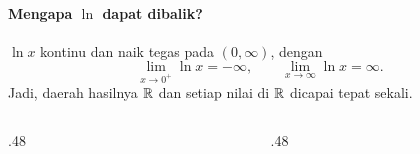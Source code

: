 \documentclass{../../kalkulus-ppt}
\begin{document}
\begin{frame}{\insertsection}
    \framesubtitle{Mengapa $\ln$ dapat dibalik?}
    \begin{teorema}
        $\ln x$ kontinu dan naik tegas pada $(0,\infty)$, dengan
        \[
            \lim_{x\to 0^+}\ln x=-\infty,\qquad
            \lim_{x\to\infty}\ln x=\infty.
        \]
        Jadi, daerah hasilnya $\mathbb{R}$ dan setiap nilai di $\mathbb{R}$ dicapai tepat sekali.
    \end{teorema}
    \begin{columns}[t,onlytextwidth]
        \begin{column}{.48\textwidth}
        \end{column}
        \begin{column}{.48\textwidth}
        \end{column}
    \end{columns}
\end{frame}
\end{document}
